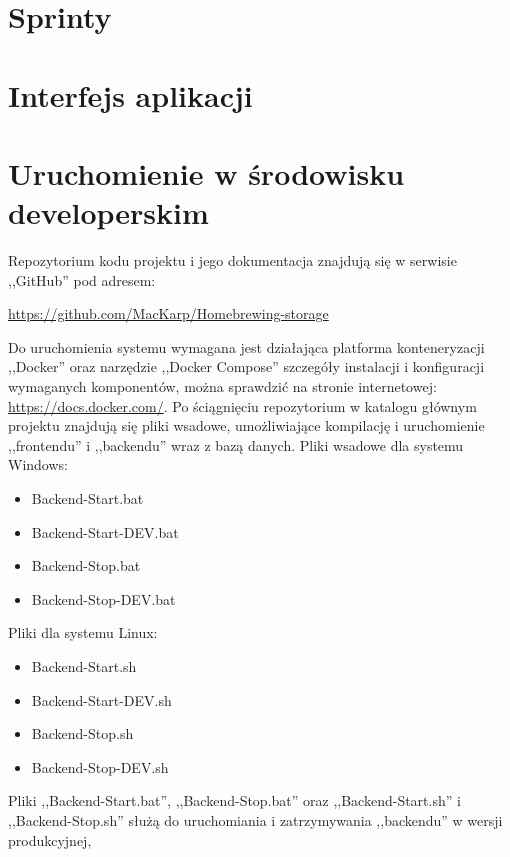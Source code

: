 \documentclass[12pt,a4paper]{article}
\begin{document}
	\section{Sprinty}
	\newpage
	
	\section{Interfejs aplikacji}
	\newpage
	
	\section{Uruchomienie w środowisku developerskim}
		\indent Repozytorium kodu projektu i jego dokumentacja znajdują się w serwisie ,,GitHub'' pod adresem: 
			\begin{tcolorbox}[minipage,colback=white,arc=0pt,outer arc=0pt, fontupper=\scriptsize]
				\url{https://github.com/MacKarp/Homebrewing-storage}
			\end{tcolorbox}
		\indent Do uruchomienia systemu wymagana jest działająca platforma konteneryzacji ,,Docker''
			oraz narzędzie ,,Docker Compose'' szczegóły instalacji i konfiguracji wymaganych
			komponentów, można sprawdzić na stronie internetowej: \url{https://docs.docker.com/}.
		\indent Po ściągnięciu repozytorium w katalogu głównym projektu znajdują się pliki wsadowe, umożliwiające kompilację i uruchomienie ,,frontendu'' i ,,backendu''
		wraz z bazą danych.
		Pliki wsadowe dla systemu Windows:
		\begin{itemize}
			\item Backend-Start.bat
			\item Backend-Start-DEV.bat
			\item Backend-Stop.bat
			\item Backend-Stop-DEV.bat
		\end{itemize}
		Pliki dla systemu Linux:
		\begin{itemize}
			\item Backend-Start.sh
			\item Backend-Start-DEV.sh
			\item Backend-Stop.sh
			\item Backend-Stop-DEV.sh
		\end{itemize}
		Pliki ,,Backend-Start.bat'', ,,Backend-Stop.bat'' oraz ,,Backend-Start.sh'' i ,,Backend-Stop.sh'' służą do uruchomiania i zatrzymywania ,,backendu'' w wersji produkcyjnej,
\end{document}
